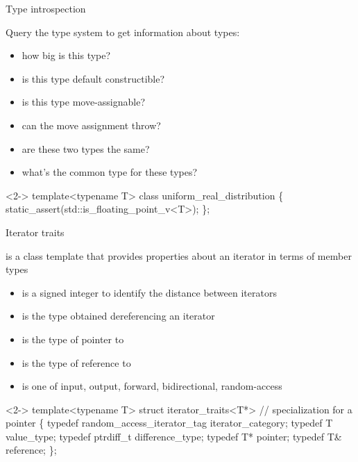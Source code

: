 \begin{frame}[fragile]{Type introspection}

  Query the type system to get information about types:
  \begin{itemize}
  \item how big is this type? {\small{}}
  \item is this type default constructible? {\small{}}
  \item is this type move-assignable? {\small{}}
  \item can the move assignment throw? {\small{}}
  \item are these two types the same? \small{}
  \item what's the common type for these types? {\small{}}
  \end{itemize}

  \begin{codeblock}<2->{
template<typename T>
class uniform_real_distribution \{
  static_assert(std::is_floating_point_v<T>);
  \ddd
\};}\end{codeblock}

\end{frame}

\begin{frame}[fragile]{Iterator traits}

   is a class template that provides
    properties about an iterator in terms of member types
    \begin{itemize}
    \item {} is a signed integer to identify the
      distance between iterators
    \item {} is the type obtained dereferencing an iterator
    \item {} is the type of pointer to 
    \item {} is the type of reference to 
    \item {} is one of input, output, forward,
      bidirectional, random-access
  \end{itemize}
  
  \begin{codeblock}<2->{
template<typename T>
struct iterator\_traits<T*> // specialization for a pointer
\{
  typedef random_access_iterator_tag iterator_category;
  typedef T                          value_type;
  typedef ptrdiff_t                  difference_type;
  typedef T*                         pointer;
  typedef T&                         reference;
\};}\end{codeblock}
\end{frame}

